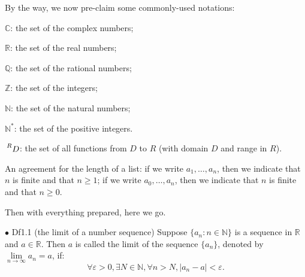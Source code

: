 \documentclass{article}
\begin{document}
By the way, we now pre-claim some commonly-used notations:
\begin{compactenum}
    \item $\mathbb{C}$: the set of the complex numbers;
    \item $\mathbb{R}$: the set of the real numbers;
    \item $\mathbb{Q}$: the set of the rational numbers;
    \item $\mathbb{Z}$: the set of the integers;
    \item $\mathbb{N}$: the set of the natural numbers;
    \item $\mathbb{N^\ast}$: the set of the positive integers.
    \item $\sideset{^R}{}{\mathop{D}}$: the set of all functions from $D$ to $R$ (with domain $D$ and range in $R$).
    \item An agreement for the length of a list: if we write $a_1, \dots, a_n$, then we indicate that $n$ is finite and that $n\geq 1$; if we write $a_0, \dots, a_n$, then we indicate that $n$ is finite and that $n\geq 0$.
\end{compactenum} 
Then with everything prepared, here we go.

\begin{Df}{$\bullet$ Df1.1 (the limit of a number sequence)}
    Suppose $\{a_n: n\in\mathbb{N}\}$ is a sequence in $\mathbb{R}$ and $a\in\mathbb{R}$. Then $a$ is called the limit of the sequence $\{a_n\}$, denoted by $\lim\limits_{n\to\infty}a_n=a$, if: 
    $$\forall \varepsilon>0, \exists N\in\mathbb{N}, \forall n > N, |a_n-a|<\varepsilon.$$
\end{Df}
\end{document}
